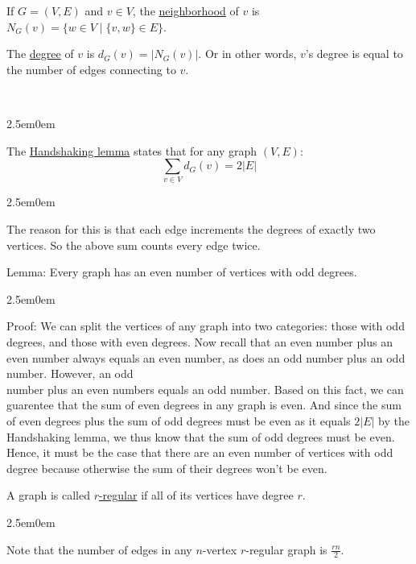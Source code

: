 \documentclass{book}
\newcommand{\hOneOld}{%
   \color{Black}%
   \fontsize{14}{14}\selectfont%
}
\newcommand{\hTwoOldd}{%
   \color{MidnightBlue}%
   \fontsize{13}{13}\selectfont%
}
\newcommand{\hThreeOld}{%
   \color{PineGreen}
   \fontsize{13}{13}\selectfont%
}
\newenvironment{myIndent}{%
   \begin{adjustwidth}{2.5em}{0em}%
}{%
   \end{adjustwidth}%
}
\newcommand{\udefine}[1]{{%
   \setulcolor{Red}%
   \setul{0.14em}{0.07em}%
   \ul{#1}%
}}
\newcommand{\uuline}[2][.]{%
{\vphantom{a}\color{#1}%
\rlap{\rule[-0.18em]{\widthof{#2}}{0.06em}}%
\rlap{\rule[-0.32em]{\widthof{#2}}{0.06em}}}%
#2}
\newcommand{\mySepTwo}[1][.]{%
   {\noindent\color{#1}{\rule{6.5in}{0.5mm}}}\\%
}
\begin{document}
\newpage
\hOneOld
If $G = (V, E)$ and $v \in V$, the \udefine{neighborhood} of $v$ is
$N_{G}(v)=\{w \in V \mid \{v, w\} \in E\}$. \bigbreak

The \udefine{degree} of $v$ is $d_{G}(v) = \lvert N_{G}(v) \rvert$.
Or in other words, $v$'s degree is equal to the number of edges 
connecting to $v$.

\mySepTwo[MidnightBlue]
\hTwoOldd
\begin{myIndent}
   The \udefine{Handshaking lemma} states that for any graph $(V, E)$:
      {\fontsize{16}{15}\selectfont
      \[ \sum_{v \in V} d_{G}(v) = 2 \lvert E \rvert \]}
   
   \hThreeOld
   \begin{myIndent}
      The reason for this is that each edge increments the degrees of
      exactly two vertices. So the above sum counts every edge twice.
      \hfill \bigbreak
   \end{myIndent}

   \hTwoOldd
   \uuline{Lemma}: Every graph has an even number of vertices with odd
   degrees.

   \hThreeOld
   \begin{myIndent}
      Proof: We can split the vertices of any graph into two categories:
      those with odd degrees, and those with even degrees.
      \hfill \bigbreak
      Now recall that an even number plus an even number always equals
      an even number, as does an odd number plus an odd number. However,
      an odd\\ number plus an even numbers equals an odd number. Based on
      this fact, we can guarentee that the sum of even degrees in any
      graph is even. And since the sum of even degrees plus the sum of 
      odd degrees must be even as it equals $2 \lvert E \rvert$ by
      the Handshaking lemma, we thus know that the sum of odd degrees 
      must be even. Hence, it must be the case that there are an even 
      number of vertices with odd degree because otherwise the sum of 
      their degrees won't be even.
      \hfill \bigbreak
   \end{myIndent}

   \hTwoOldd
   A graph is called \udefine{$r$-regular} if all of its vertices have
   degree $r$.
   \hThreeOld
   \begin{myIndent}
      Note that the number of edges in any $n$-vertex $r$-regular graph is
      $ \displaystyle{\frac{rn}{2}}$.
      \hfill \bigbreak
   \end{myIndent}
   

\end{myIndent}
\end{document}
